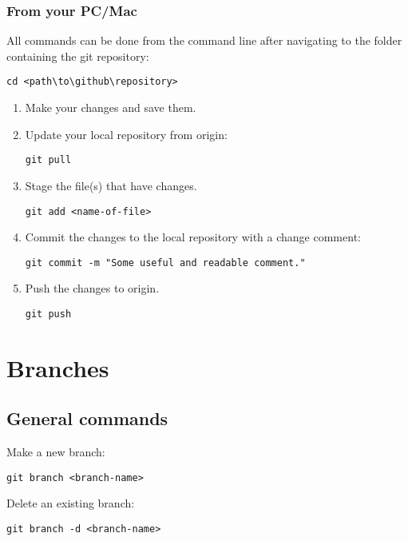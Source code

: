 \documentclass{article}
\begin{document}
\subsubsection{From your PC/Mac}
All commands can be done from the command line after navigating to the folder containing the git repository:
\begin{verbatim}
cd <path\to\github\repository>
\end{verbatim}

\begin{enumerate}
    \item Make your changes and save them.
    \item Update your local repository from origin:
	\begin{verbatim}
git pull   
    \end{verbatim}
	\item Stage the file(s) that have changes.
	\begin{verbatim}
git add <name-of-file>
    \end{verbatim}
	\item Commit the changes to the local repository with a change comment:
	\begin{verbatim}
git commit -m "Some useful and readable comment."
    \end{verbatim}
	\item Push the changes to origin.
	\begin{verbatim}
git push
    \end{verbatim}
\end{enumerate}

\section{Branches}

\subsection{General commands}

Make a new branch:
\begin{verbatim}
git branch <branch-name>
\end{verbatim}

Delete an existing branch:
\begin{verbatim}
git branch -d <branch-name>
\end{verbatim}
\end{document}
